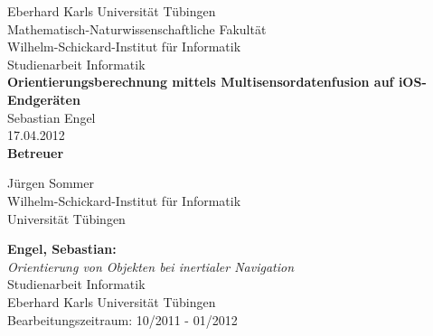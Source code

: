 \documentclass[twoside,12pt,a4paper]{report}
\begin{document}
\setlength\parindent{0pt} 


 
\begin{titlepage}
	\begin{center}
  		{\LARGE Eberhard Karls Universität Tübingen}\\
		{\large Mathematisch-Naturwissenschaftliche Fakultät \\
		Wilhelm-Schickard-Institut für Informatik\\[4cm]}
  		{\huge Studienarbeit Informatik\\[2cm]}
  		{\Large\bf  Orientierungsberechnung mittels Multisensordatenfusion auf iOS-Endgeräten\\[1.5cm]}
 		{\large Sebastian Engel}\\[0.5cm]
		17.04.2012 \\[4cm]
		{\small\bf Betreuer}\\[0.5cm]
  		\parbox{7cm}{
  			\begin{center}
				{\large Jürgen Sommer}\\
	  			{\footnotesize Wilhelm-Schickard-Institut für Informatik\\
				Universität Tübingen}
			\end{center}
 		}
 	\end{center}
\end{titlepage}


\thispagestyle{empty}
\vspace*{\fill}
\begin{minipage}{11.2cm}
\textbf{Engel, Sebastian:}\\
\emph{Orientierung von Objekten bei inertialer Navigation}\\ Studienarbeit Informatik\\
Eberhard Karls Universität Tübingen\\
Bearbeitungszeitraum: 10/2011 - 01/2012
\end{minipage}
\newpage


\setcounter{page}{1}
\end{document}
